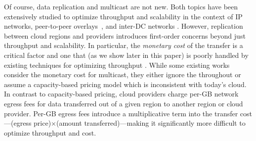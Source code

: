 Of course, data replication and multicast are not new.
Both topics have been extensively studied to optimize throughput and scalability in the context of IP networks, peer-to-peer overlays~\cite{flinn2022owl, castro2003splitstream, kostic2003bullet, chu2001enabling, facebook-bittorrent}, and inter-DC networks \cite{zhang2018bds, fatemipour2022cost, luo2019deadline, tseng2021codedbulk}.
However, replication between cloud regions and providers introduces first-order concerns beyond just throughput and scalability.
In particular, the \textit{monetary cost} of the transfer is a critical factor and one that (as we show later in this paper) is poorly handled by existing techniques for optimizing throughput \cite{zhang2018bds, kostic2003bullet, luo2019deadline}. While some existing works consider the monetary cost for multicast, they either ignore the throughout \cite{garcia2015cost} or assume a capacity-based pricing model  \cite{luo2021cost} which is inconsistent with today's cloud. In contrast to  capacity-based pricing,  
cloud providers charge per-GB network egress fees for data transferred out of a given region to another region or cloud provider. 
Per-GB egress fees introduce a multiplicative term into the transfer cost---(egress price)$\times$(amount transferred)---making it significantly more difficult to optimize throughput and cost. 


